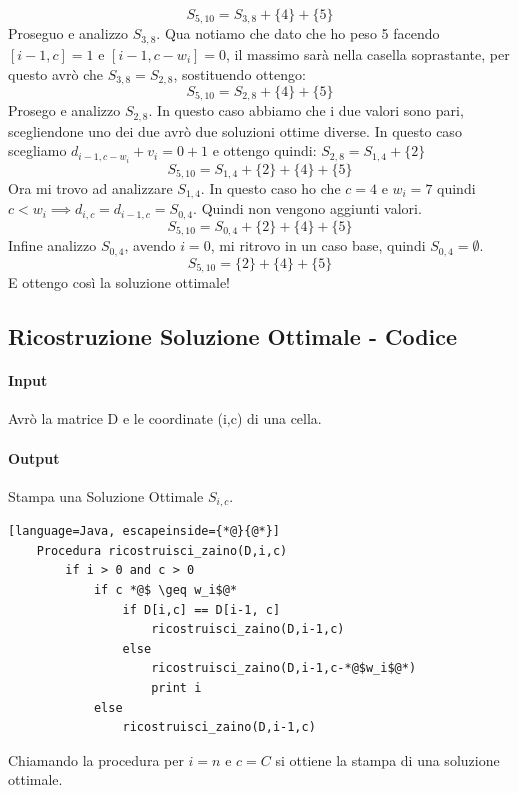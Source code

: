 \[S_{5,10} = S_{3,8} +\{4\} + \{5\}\]
Proseguo e analizzo $S_{3,8}$. Qua notiamo che dato che ho peso 5 facendo $[i-1,c]=1$ e $[i-1,c-w_i]=0$, 
il massimo sarà nella casella soprastante, per questo avrò che $S_{3,8}=S_{2,8}$, sostituendo ottengo:
\[S_{5,10} = S_{2,8} +\{4\} + \{5\}\]
Prosego e analizzo $S_{2,8}$. In questo caso abbiamo che i due valori sono pari, scegliendone uno dei
due avrò due soluzioni ottime diverse. In questo caso scegliamo $d_{i-1,c-w_i}+v_i = 0+1$ e ottengo quindi:
$S_{2,8} = S_{1,4} + \{2\}$
\[ S_{5,10} = S_{1,4} +\{2\}+\{4\} + \{5\}\]
Ora mi trovo ad analizzare $S_{1,4}$. In questo caso ho che $c=4$ e $w_i=7$ quindi $c<w_i \implies 
d_{i,c} = d_{i-1,c} = S_{0,4}$. Quindi non vengono aggiunti valori.
\[ S_{5,10} = S_{0,4} +\{2\}+\{4\} + \{5\}\]
Infine analizzo $S_{0,4}$, avendo $i=0$, mi ritrovo in un caso base, quindi $S_{0,4}=\emptyset$.
\[ S_{5,10} = \{2\}+\{4\} + \{5\}\]
E ottengo così la soluzione ottimale!
\subsection{Ricostruzione Soluzione Ottimale - Codice}
\paragraph*{Input} Avrò la matrice D e le coordinate (i,c) di una cella.
\paragraph*{Output} Stampa una Soluzione Ottimale $S_{i,c}$.
\begin{lstlisting}[language=Java, escapeinside={*@}{@*}]
    Procedura ricostruisci_zaino(D,i,c)
        if i > 0 and c > 0
            if c *@$ \geq w_i$@*
                if D[i,c] == D[i-1, c]
                    ricostruisci_zaino(D,i-1,c)
                else
                    ricostruisci_zaino(D,i-1,c-*@$w_i$@*)
                    print i
            else
                ricostruisci_zaino(D,i-1,c)
\end{lstlisting}
Chiamando la procedura per $i = n$ e $c = C$ si ottiene la
stampa di una soluzione ottimale.